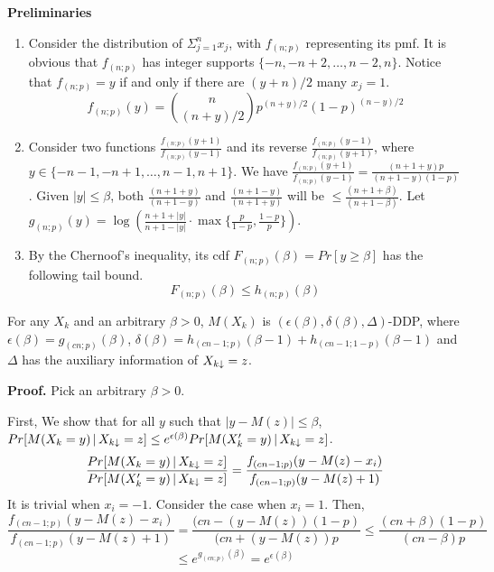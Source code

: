 \documentclass[11pt]{article}
\begin{document}
{\bf Preliminaries}\\
\begin{enumerate}
\item Consider the distribution of $\Sigma_{j=1}^{n} x_{j}$, with $f_{(n;p)}$ representing its pmf. It is obvious that $f_{(n;p)}$ has integer supports $\{-n, -n+2 , \dots , n-2, n\}$. Notice that $f_{(n;p)} = y$ if and only if there are $(y+n)/2$ many $x_{j}=1$.
\begin{equation}
f_{(n;p)}(y) = {n \choose (n+y)/2} p^{(n+y)/2} (1-p)^{(n-y)/2}
\end{equation} 
\item Consider two functions $\frac{f_{(n;p)}(y+1)}{f_{(n;p)}(y-1)}$ and its reverse $\frac{f_{(n;p)}(y-1)}{f_{(n;p)}(y+1)}$, where $y \in \{-n-1, -n+1 , \dots , n-1, n+1\}$. We have $\frac{f_{(n;p)}(y+1)}{f_{(n;p)}(y-1)}= \frac{(n+1+y)p}{(n+1-y)(1-p)}$. 
Given $|y| \leq \beta$, both $\frac{(n+1+y)}{(n+1-y)}$ and $\frac{(n+1-y)}{(n+1+y)}$ will be  $\leq  \frac{(n+1+\beta)}{(n+1-\beta)}$. Let $g_{(n;p)}(y) = \log ( \frac{n+1+|y|}{n+1-|y|} \cdot \max \{\frac{p}{1-p}, \frac{1-p}{p} \})$.
\item By the Chernoof's inequality, its cdf $F_{(n;p)}(\beta) = Pr [y \geq \beta] $ has the following tail bound.
\begin{equation}
F_{(n;p)}(\beta) \leq h_{(n;p)}(\beta)
\end{equation}
\end{enumerate}

\begin{theorem}
For any $X_{k}$ and an arbitrary $\beta >0$, $M(X_{k})$  is $(\epsilon(\beta), \delta(\beta),  \Delta)$-DDP, where $\epsilon(\beta)= g_{(cn ; p)}(\beta)$, $\delta(\beta)=h_{(cn-1; p)}(\beta-1) + h_{(cn-1; 1-p)}(\beta-1)$ and $\Delta$ has the auxiliary information of $X_{k \downarrow}=z$.
\end{theorem}
{\bf Proof.} Pick an arbitrary $\beta >0$. 

First, We show that for all $y$ such that $|y- M(z)| \leq \beta$, $Pr[M(X_{k} = y)\,|\,X_{k \downarrow}=z] \leq e^{\epsilon (\beta)} Pr[M(X_{k}' = y)\,|\,X_{k \downarrow}=z] $. 
\[
\frac{Pr[M(X_{k} = y)\,|\,X_{k \downarrow}=z]}{Pr[M(X_{k}' = y)\,|\,X_{k \downarrow}=z] } = \frac{f_{(cn-1 ; p)} (y - M(z) - x_{i})}{f_{(cn-1 ; p)} (y - M(z) +1)}
\] 
It is trivial when $x_{i}=-1$. Consider the case when $x_{i} =1$. Then,
\[
 \frac{f_{(cn-1 ; p)} (y - M(z) - x_{i})}{f_{(cn-1 ; p)} (y - M(z) +1)} = \frac {(cn- (y-M(z))(1-p)}{(cn+(y- M(z))p} \leq \frac {(cn + \beta)(1-p)}{(cn- \beta)p}
\]
\[
\leq e^{g_{(cn ; p)} (\beta)} =e^{\epsilon(\beta)}
\]
\end{document}
